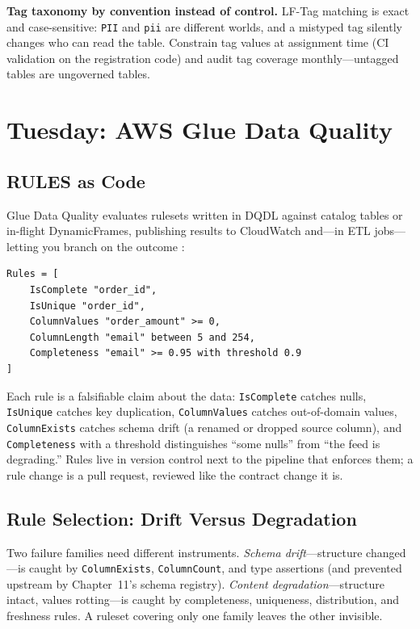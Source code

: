 \begin{pitfall}
\textbf{Tag taxonomy by convention instead of control.} LF-Tag matching is exact and case-sensitive: \texttt{PII} and \texttt{pii} are different worlds, and a mistyped tag silently changes who can read the table. Constrain tag values at assignment time (CI validation on the registration code) and audit tag coverage monthly---untagged tables are ungoverned tables.
\end{pitfall}

\section{Tuesday: AWS Glue Data Quality}
\subsection{RULES as Code}
Glue Data Quality evaluates rulesets written in DQDL against catalog tables or in-flight DynamicFrames, publishing results to CloudWatch and---in ETL jobs---letting you branch on the outcome \cite{awsGlueDataQualityDocs}:

\begin{lstlisting}[caption={A DQDL ruleset for the orders feed.},label={lst:ch22-dqdl}]
Rules = [
    IsComplete "order_id",
    IsUnique "order_id",
    ColumnValues "order_amount" >= 0,
    ColumnLength "email" between 5 and 254,
    Completeness "email" >= 0.95 with threshold 0.9
]
\end{lstlisting}

Each rule is a falsifiable claim about the data: \texttt{IsComplete} catches nulls, \texttt{IsUnique} catches key duplication, \texttt{ColumnValues} catches out-of-domain values, \texttt{ColumnExists} catches schema drift (a renamed or dropped source column), and \texttt{Completeness} with a threshold distinguishes ``some nulls'' from ``the feed is degrading.'' Rules live in version control next to the pipeline that enforces them; a rule change is a pull request, reviewed like the contract change it is.

\subsection{Rule Selection: Drift Versus Degradation}
Two failure families need different instruments. \emph{Schema drift}---structure changed---is caught by \texttt{ColumnExists}, \texttt{ColumnCount}, and type assertions (and prevented upstream by Chapter~11's schema registry). \emph{Content degradation}---structure intact, values rotting---is caught by completeness, uniqueness, distribution, and freshness rules. A ruleset covering only one family leaves the other invisible.

